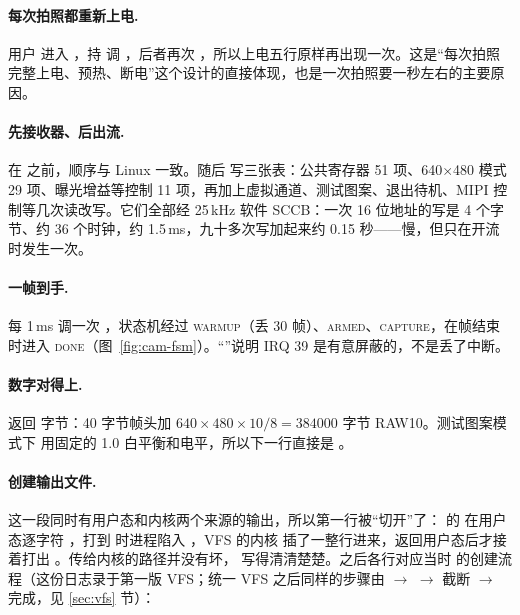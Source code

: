 \paragraph{ 每次拍照都重新上电.} 用户  进入 ，持  调 ，后者再次 ，所以上电五行原样再出现一次。这是“每次拍照完整上电、预热、断电”这个设计的直接体现，也是一次拍照要一秒左右的主要原因。

\paragraph{ 先接收器、后出流.}  在  之前，顺序与 Linux 一致。随后  写三张表：公共寄存器 51 项、640$\times$480 模式 29 项、曝光增益等控制 11 项，再加上虚拟通道、测试图案、退出待机、MIPI 控制等几次读改写。它们全部经 25\,kHz 软件 SCCB：一次 16 位地址的写是 4 个字节、约 36 个时钟，约 1.5\,ms，九十多次写加起来约 0.15 秒——慢，但只在开流时发生一次。

\paragraph{ 一帧到手.}  每 1\,ms 调一次 ，状态机经过 \textsc{warmup}（丢 30 帧）、\textsc{armed}、\textsc{capture}，在帧结束时进入 \textsc{done}（图~\ref{fig:cam-fsm}）。“”说明 IRQ 39 是有意屏蔽的，不是丢了中断。

\paragraph{ 数字对得上.}  返回  字节：40 字节帧头加 $640\times480\times10/8=384000$ 字节 RAW10。测试图案模式下  用固定的 1.0 白平衡和电平，所以下一行直接是 。

\paragraph{ 创建输出文件.} 这一段同时有用户态和内核两个来源的输出，所以第一行被“切开”了： 的  在用户态逐字符 ，打到  时进程陷入 ，VFS 的内核  插了一整行进来，返回用户态后才接着打出 。传给内核的路径并没有坏， 写得清清楚楚。之后各行对应当时  的创建流程（这份日志录于第一版 VFS；统一 VFS 之后同样的步骤由  $\to$  $\to$  截断 $\to$  完成，见 \ref{sec:vfs} 节）：

